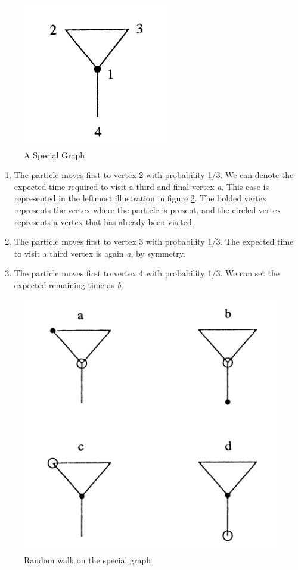 \documentclass[11pt]{article}
\begin{document}
\begin{figure}[H]
\centering
\includegraphics[scale = 0.7]{ASpecialGraph}
\caption{A Special Graph \protect\cite{BG}}
\label{fig:specialGraph}
\end{figure}

\begin{enumerate}
  \item The particle moves first to vertex 2 with probability 1/3. We can denote the expected time required to visit a third and final vertex \textit{a}. This case is represented in the leftmost illustration in figure \ref{fig:specialGraphCases}. The bolded vertex represents the vertex where the particle is present, and the circled vertex represents a vertex that has already been visited.
  \item The particle moves first to vertex 3 with probability 1/3. The expected time to visit a third vertex is again \textit{a}, by symmetry.
  \item The particle moves first to vertex 4 with probability 1/3. We can set the expected remaining time as \textit{b}.
\end{enumerate}

\begin{figure}[h]
\centering
\includegraphics[scale = 0.5]{SpecialGraphCases}
\caption{Random walk on the special graph \protect\cite{BG}}
\label{fig:specialGraphCases}
\end{figure}
\end{document}
